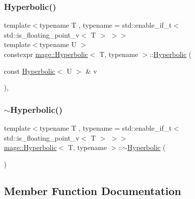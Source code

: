 \subsubsection{\texorpdfstring{Hyperbolic()}{Hyperbolic()}\hspace{0.1cm}{\footnotesize\ttfamily [5/5]}}
{\footnotesize\ttfamily template$<$typename T , typename  = std\+::enable\+\_\+if\+\_\+t$<$ std\+::is\+\_\+floating\+\_\+point\+\_\+v$<$ T $>$ $>$$>$ \\
template$<$typename U $>$ \\
constexpr \mbox{\hyperlink{structmage_1_1_hyperbolic}{mage\+::\+Hyperbolic}}$<$ T, typename $>$\+::\mbox{\hyperlink{structmage_1_1_hyperbolic}{Hyperbolic}} (\begin{DoxyParamCaption}\item[{const \mbox{\hyperlink{structmage_1_1_hyperbolic}{Hyperbolic}}$<$ U $>$ \&}]{v }\end{DoxyParamCaption})\hspace{0.3cm}{\ttfamily [explicit]}, {\ttfamily [noexcept]}}

\mbox{\label{structmage_1_1_hyperbolic_a893662ddeea9d31b08b24c7b848a1b48}} 
\subsubsection{\texorpdfstring{$\sim$\+Hyperbolic()}{~Hyperbolic()}}
{\footnotesize\ttfamily template$<$typename T , typename  = std\+::enable\+\_\+if\+\_\+t$<$ std\+::is\+\_\+floating\+\_\+point\+\_\+v$<$ T $>$ $>$$>$ \\
\mbox{\hyperlink{structmage_1_1_hyperbolic}{mage\+::\+Hyperbolic}}$<$ T, typename $>$\+::$\sim$\mbox{\hyperlink{structmage_1_1_hyperbolic}{Hyperbolic}} (\begin{DoxyParamCaption}{ }\end{DoxyParamCaption})\hspace{0.3cm}{\ttfamily [default]}}



\subsection{Member Function Documentation}
\mbox{\label{structmage_1_1_hyperbolic_ace982d2de87fd9033c85edcbb993d54e}} 
